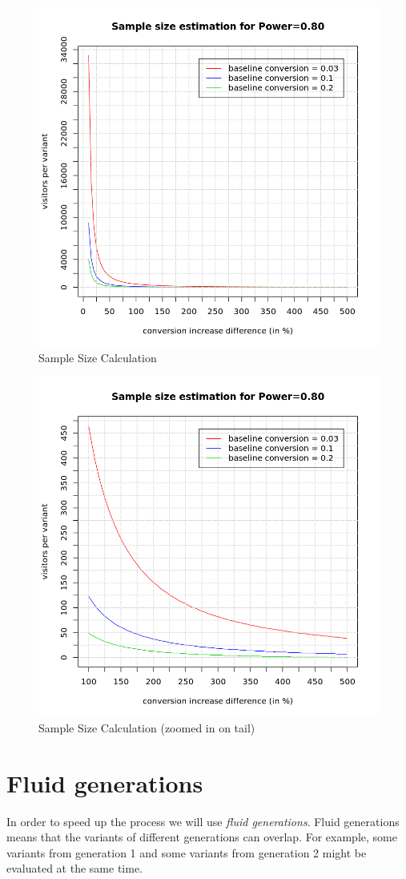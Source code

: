 \documentclass{report}
\begin{document}
\begin{figure}[ht]
	\centering
	\includegraphics[width=0.8\linewidth]{imgs/samplesizefull.png}
	\caption{Sample Size Calculation}
	\label{fig:samplesize}
\end{figure}
\begin{figure}[ht]
	\centering
	\includegraphics[width=0.8\linewidth]{imgs/samplesize.png}
	\caption{Sample Size Calculation (zoomed in on tail)}
	\label{fig:samplesize2}
\end{figure}
\FloatBarrier

\section{Fluid generations}
In order to speed up the process we will use \textit{fluid generations}. Fluid generations means that the variants of different generations can overlap. For example, some variants from generation 1 and some variants from generation 2 might be evaluated at the same time.\\
\end{document}
